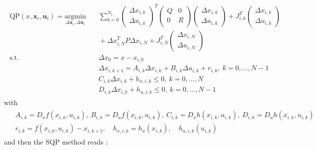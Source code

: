 \documentclass[12pt]{article}
\begin{document}
\begin{align}
	\begin{split}
		\label{eq:SQP-QP}
		\mathrm{QP}(x, \mathbf{x}_i, \mathbf{u}_i)=\underset{\Delta\mathbf{x}_i,\Delta\mathbf{u}_i}{\mathrm{argmin}} & \quad \sum_{k=0}^{N_1}\begin{pmatrix}\Delta x_{i,k}\\\Delta u_{i,k}\end{pmatrix}^T\begin{pmatrix}Q & 0\\0 & R\\\end{pmatrix}\begin{pmatrix}\Delta x_{i,k}\\\Delta u_{i,k}\end{pmatrix}+J_{i,k}^T\begin{pmatrix}\Delta x_{i,k}\\\Delta u_{i,k}\end{pmatrix}\\
		&\quad +\Delta x_{i,N}^TP\Delta x_{i,N}+J_{i,N}^T\begin{pmatrix}\Delta x_{i,N}\\\Delta u_{i,N}\end{pmatrix}\\
		\text{s.t.} &\quad \Delta x_0=x-x_{i,0}\\
		&\quad \Delta x_{i,k+1}=A_{i,k}\Delta x_{i,k}+B_{i,k}\Delta u_{i,k}+r_{i,k},~k=0,\dots,N-1\\
		&\quad C_{i,k}\Delta x_{i,k}+h_{x,i,k}\leq 0,~k=0,\dots,N\\
		&\quad D_{i,k}\Delta x_{i,k}+h_{u,i,k}\leq 0,~k=0,\dots,N-1
	\end{split}
\end{align}
with
\begin{align}
	\begin{split}
		\label{eq:SQP-sensitivities}
		&A_{i,k}=D_xf(x_{i,k}, u_{i,k}),~B_{i,k}=D_uf(x_{i,k}, u_{i,k}),~C_{i,k}=D_xh(x_{i,k}, u_{i,k}),~D_{i,k}=D_uh(x_{i,k}, u_{i,k})\\
		&r_{i,k}=f(x_{i,k}, u_{i,k})-x_{i,k+1},\quad h_{x,i,k}=h_x(x_{i,k}),\quad h_{u,i,k}(u_{i,k})
	\end{split}
\end{align}
and then the SQP method reads :
\end{document}
